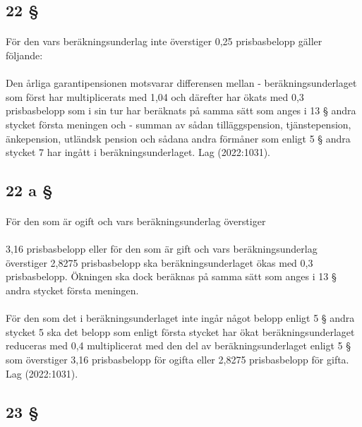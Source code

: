 \documentclass[a4paper,notitlepage,openany,10pt]{book}
\begin{document}
\subsection*{22 §}
\paragraph*{}
För den vars beräkningsunderlag inte överstiger 0,25 prisbasbelopp gäller följande:
\paragraph*{}
Den årliga garantipensionen motsvarar differensen mellan
\newline - beräkningsunderlaget som först har multiplicerats med 1,04 och därefter har ökats med 0,3 prisbasbelopp som i sin tur har beräknats på samma sätt som anges i 13 § andra stycket första meningen och
\newline - summan av sådan tilläggspension, tjänstepension, änkepension, utländsk pension och sådana andra förmåner som enligt 5 § andra stycket 7 har ingått i beräkningsunderlaget.
Lag (2022:1031).
\subsection*{22 a §}
\paragraph*{}
För den som är ogift och vars beräkningsunderlag överstiger
\paragraph*{}
3,16 prisbasbelopp eller för den som är gift och vars beräkningsunderlag överstiger 2,8275 prisbasbelopp ska beräkningsunderlaget ökas med 0,3 prisbasbelopp. Ökningen ska dock beräknas på samma sätt som anges i 13 § andra stycket första meningen.
\paragraph*{}
För den som det i beräkningsunderlaget inte ingår något belopp enligt 5 § andra stycket 5 ska det belopp som enligt första stycket har ökat beräkningsunderlaget reduceras med 0,4 multiplicerat med den del av beräkningsunderlaget enligt 5 § som överstiger 3,16 prisbasbelopp för ogifta eller 2,8275 prisbasbelopp för gifta.
Lag (2022:1031).
\subsection*{23 §}
\end{document}
